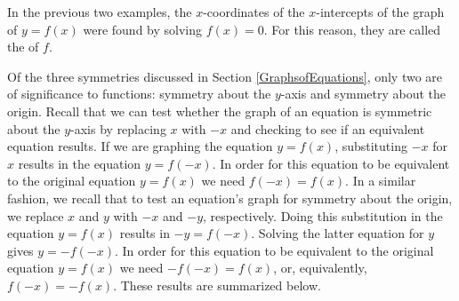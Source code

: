 \medskip


In the previous two examples, the $x$-coordinates of the $x$-intercepts of the graph of $y=f(x)$ were found by solving $f(x) = 0$.  For this reason, they are called the   of $f$.

\smallskip


\smallskip

Of the three symmetries discussed in Section \ref{GraphsofEquations}, only two are of significance to functions:  symmetry about the $y$-axis and symmetry about the origin.  Recall that we can test whether the graph of an equation is symmetric about the $y$-axis by replacing $x$ with $-x$ and checking to see if an equivalent equation results.  If we are graphing the equation $y=f(x)$, substituting $-x$ for $x$ results in the equation $y=f(-x)$.  In order for this equation to be equivalent to the original equation $y=f(x)$ we need $f(-x) = f(x)$.  In a similar fashion, we recall that to test an equation's graph for symmetry about the origin, we replace $x$ and $y$ with $-x$ and $-y$, respectively.  Doing this substitution in the equation $y = f(x)$ results in $-y = f(-x)$.  Solving the latter equation for $y$ gives $y = -f(-x)$.  In order for this equation to be equivalent to the original equation $y=f(x)$ we need $-f(-x) = f(x)$, or, equivalently, $f(-x) = -f(x)$.  These results are summarized below.


\smallskip


